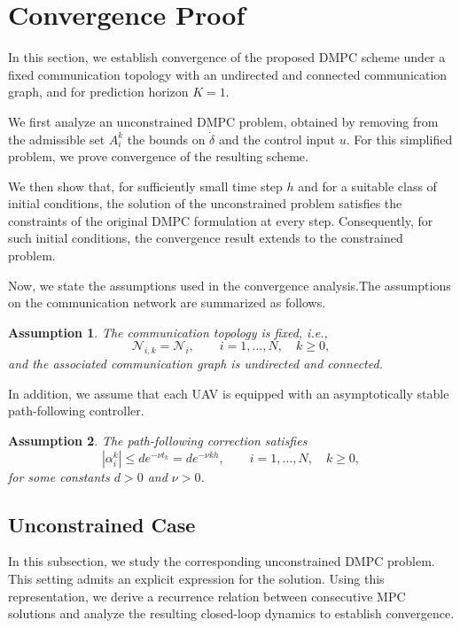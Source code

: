 \documentclass[letterpaper,journal]{IEEEtran}
\newtheorem{assumption}{Assumption}
\begin{document}
\section{Convergence Proof}

In this section, we establish convergence of the proposed DMPC scheme under a fixed communication topology with an undirected and connected communication graph, and for prediction horizon \(K=1\).

We first analyze an unconstrained DMPC problem, obtained by removing from the admissible set \(A_i^k\) the bounds on \(\dot{\delta}\) and the control input \(u\). For this simplified problem, we prove convergence of the resulting scheme.

We then show that, for sufficiently small time step \(h\) and for a suitable class of initial conditions, the solution of the unconstrained problem satisfies the constraints of the original DMPC formulation at every step. Consequently, for such initial conditions, the convergence result extends to the constrained problem.

Now, we state the assumptions used in the convergence analysis.The assumptions on the communication network are summarized as follows.
\begin{assumption}\label{ass:graph}
The communication topology is fixed, i.e.,
\[
\mathcal N_{i,k}=\mathcal N_i,\qquad i=1,\dots,N,\quad k\ge 0,
\]
and the associated communication graph is undirected and connected.
\end{assumption}

In addition, we assume that each UAV is equipped with an asymptotically stable path-following controller.
\begin{assumption}\label{ass:tracking}
The path-following correction satisfies
\[
|\alpha_i^k|\le d e^{-\nu t_k}=d e^{-\nu kh},
\qquad i=1,\dots,N,\quad k\ge 0,
\]
for some constants \(d>0\) and \(\nu>0\).
\end{assumption}



\subsection{Unconstrained Case}\label{sec:unconstraint}
In this subsection, we study the corresponding unconstrained DMPC problem. This setting admits an explicit expression for the solution. Using this representation, we derive a recurrence relation between consecutive MPC solutions and analyze the resulting closed-loop dynamics to establish convergence.
\end{document}

